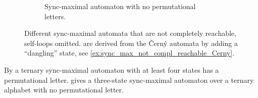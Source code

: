 \begin{example}
\begin{figure}[ht]
\begin{subfigure}[b]{0.25\textwidth}
{
			}
			\caption{Sync-maximal automaton with no permutational letters.}
			\label{sync_max:fig:ternary}
		\end{subfigure}
		\hfill
		\caption[Sync-maximal automata but not completely reachable automata]{Different sync-maximal automata that are not completely reachable, self-loops omitted. 
			are derived from the \v{C}ern\'y automata by adding a ``dangling'' state,
			see \cref{ex:sync_max_not_compl_reachable_Cerny}.}		
		\label{fig:three graphs}
	\end{figure}	
\end{example}

\begin{example}\label{ex:three-state-ternary-sync-max}
	By 
	a ternary sync-maximal automaton with at least four states has a permutational letter.
	 gives a three-state sync-maximal automaton over a ternary alphabet
	with no permutational letter.
\end{example}


